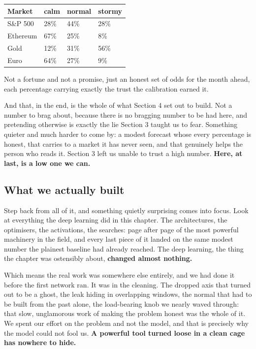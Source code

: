 \documentclass[11pt]{article} %
\begin{document}
\begin{center}
\begin{tabular}{llll}
\hline
Market & calm & normal & stormy \\
\hline
S\&P 500 & 28\% & 44\% & 28\% \\
Ethereum & 67\% & 25\% & 8\% \\
Gold & 12\% & 31\% & 56\% \\
Euro & 64\% & 27\% & 9\% \\
\hline
\end{tabular}
\end{center}


Not a fortune and not a promise, just an honest set of odds for the month ahead, each percentage carrying exactly the trust the calibration earned it.

And that, in the end, is the whole of what Section 4 set out to build. Not a number to brag about, because there is no bragging number to be had here, and pretending otherwise is exactly the lie Section 3 taught us to fear. Something quieter and much harder to come by: a modest forecast whose every percentage is honest, that carries to a market it has never seen, and that genuinely helps the person who reads it. Section 3 left us unable to trust a high number. \textbf{Here, at last, is a low one we can.}


\subsection{What we actually built}


Step back from all of it, and something quietly surprising comes into focus. Look at everything the deep learning did in this chapter. The architectures, the optimisers, the activations, the searches: page after page of the most powerful machinery in the field, and every last piece of it landed on the same modest number the plainest baseline had already reached. The deep learning, the thing the chapter was ostensibly about, \textbf{changed almost nothing.}

Which means the real work was somewhere else entirely, and we had done it before the first network ran. It was in the cleaning. The dropped axis that turned out to be a ghost, the leak hiding in overlapping windows, the normal that had to be built from the past alone, the load-bearing knob we nearly waved through: that slow, unglamorous work of making the problem honest was the whole of it. We spent our effort on the problem and not the model, and that is precisely why the model could not fool us. \textbf{A powerful tool turned loose in a clean cage has nowhere to hide.}
\end{document}
